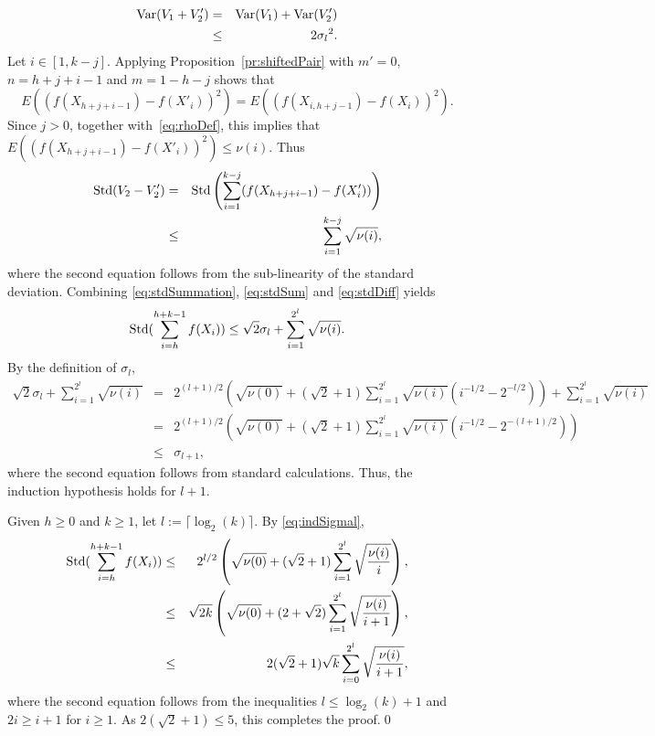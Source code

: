 \documentclass[a4paper,11pt]{article}
\begin{document}
\begin{eqnarray}\label{eq:stdSum}
{\rm Var}(V_{1}+V'_{2})&=&{\rm Var}(V_{1})+{\rm Var}(V'_{2})\nonumber\\
&\le&2{\sigma_l}^2.
\end{eqnarray}
Let  \(i\in[1, k  -j]\). Applying Proposition~\ref{pr:shiftedPair} with  \(m'=0\), \(n=h+j+i-1\) and \(m=1-h-j\) shows that
\begin{displaymath}
E((f(X_{h+j+i-1})-f(X'_{i}))^{2})=E((f(X_{i,h+j-1})-f(X_i))^{2}).
\end{displaymath} Since \(j>0\), together with~\eqref{eq:rhoDef}, this implies that       \(E((f(X_{h+j+i-1})-f(X'_{i}))^{2})\leq \nu(i)\). Thus 
\begin{eqnarray}\label{eq:stdDiff}
{\rm Std}(V_{2}-V'_{2})&=&{\rm Std}\left(\sum^{k-j}_{i=1}(f(X_{h+j+i-1})-f(X'_{i}))\right)\nonumber\\
&\le&\sum^{k-j}_{i=1}\sqrt{\nu(i)},
\end{eqnarray} where the second equation follows from the sub-linearity of the standard deviation.
Combining \eqref{eq:stdSummation}, \eqref{eq:stdSum} and \eqref{eq:stdDiff} yields \begin{equation*}
{\rm Std}(\sum ^{h+k-1}_{i=h}f(X_{i}))\le \sqrt{2}\sigma_{l}+\sum^{2^{l}}_{i=1}\sqrt{\nu(i)}.
\end{equation*}
By the definition of \(\sigma_{l}\),
\begin{eqnarray*}
 \sqrt{2}\sigma_{l}+\sum^{2^{l}}_{i=1}\sqrt{\nu(i)} &=&2^{(l+1)/2}\left( \sqrt{\nu(0)}+(\sqrt{2}+1)\sum^{2^{l}}_{i=1} \sqrt{\nu(i)}(i^{-1/2}-2^{-l/2})\right)+\sum^{2^{l}}_{i=1}\sqrt{\nu(i)}
\\&=&2^{(l+1)/2}\left( \sqrt{\nu(0)}+(\sqrt{2}+1)\sum^{2^{l}}_{i=1} \sqrt{\nu(i)}(i^{-1/2}-2^{-(l+1)/2})\right)
\\&\leq&\sigma_{l+1},
\end{eqnarray*}
where the second equation follows from standard calculations. Thus, the induction hypothesis holds for \(l+1\). 

Given  \(h\geq0\) and  \(k\geq1\), let \(l:=\lceil\log_{2}(k)\rceil\). By \eqref{eq:indSigmal},
\begin{eqnarray*}
{\rm Std}(\sum ^{h+k-1}_{i=h}f(X_{i}))
&\leq&2^{l/2}\left( \sqrt{\nu(0)}+(\sqrt{2}+1)\sum^{2^{l}}_{i=1} \sqrt{\frac{\nu(i)}{{i}}}\right),\\
&\leq&\sqrt{2k}\left( \sqrt{\nu(0)}+(2+\sqrt{2})\sum^{2^{l}}_{i=1} \sqrt{\frac{\nu(i)}{{i+1}}}\right),\\
&\leq&2(\sqrt{2}+1)\sqrt{k}\sum^{2^{l}}_{i=0} \sqrt{\frac{\nu(i)}{{i+1}}},\\
\end{eqnarray*}      
where the second equation follows from the inequalities \(l\le\log_{2}(k)+1\) and \(2i\ge i+1\) for \(i\geq1\). As \(2(\sqrt{2}+1)\leq 5\), this completes the proof.\qed 
\end{document}
